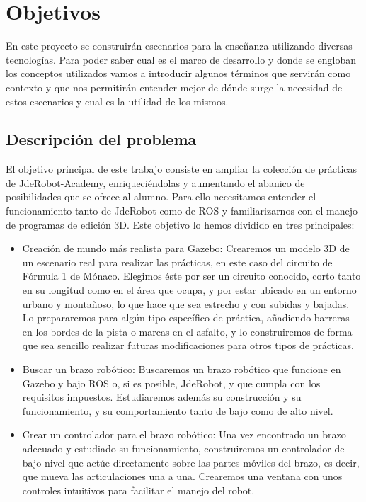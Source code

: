 \chapter{Objetivos}
\label{ch:Objetivos}

En este proyecto se construirán escenarios para la enseñanza utilizando diversas tecnologías. Para poder saber cual es el marco de desarrollo y donde se engloban los conceptos utilizados vamos a introducir algunos términos que servirán como contexto y que nos permitirán entender mejor de dónde surge la necesidad de estos escenarios y cual es la utilidad de los mismos.

\section{Descripción del problema}
\label{sec:obj_descripcionproblema}

El objetivo principal de este trabajo consiste en ampliar la colección de prácticas de JdeRobot-Academy, enriqueciéndolas y aumentando el abanico de posibilidades que se ofrece al alumno. Para ello necesitamos entender el funcionamiento tanto de JdeRobot como de ROS y familiarizarnos con el manejo de programas de edición 3D. Este objetivo lo hemos dividido en tres principales:
\begin{itemize}
	\item Creación de mundo más realista para Gazebo: Crearemos un modelo 3D de un escenario real para realizar las prácticas, en este caso del circuito de Fórmula 1 de Mónaco. Elegimos éste por ser un circuito conocido, corto tanto en su longitud como en el área que ocupa, y por estar ubicado en un entorno urbano y montañoso, lo que hace que sea estrecho y con subidas y bajadas. Lo prepararemos para algún tipo específico de práctica, añadiendo barreras en los bordes de la pista o marcas en el asfalto, y lo construiremos de forma que sea sencillo realizar futuras modificaciones para otros tipos de prácticas.
	
	\item Buscar un brazo robótico: Buscaremos un brazo robótico que funcione en Gazebo y bajo ROS o, si es posible, JdeRobot, y que cumpla con los requisitos impuestos. Estudiaremos además su construcción y su funcionamiento, y su comportamiento tanto de bajo como de alto nivel.
	
	\item Crear un controlador para el brazo robótico: Una vez encontrado un brazo adecuado y estudiado su funcionamiento, construiremos un controlador de bajo nivel que actúe directamente sobre las partes móviles del brazo, es decir, que mueva las articulaciones una a una. Crearemos una ventana con unos controles intuitivos para facilitar el manejo del robot.
\end{itemize}

